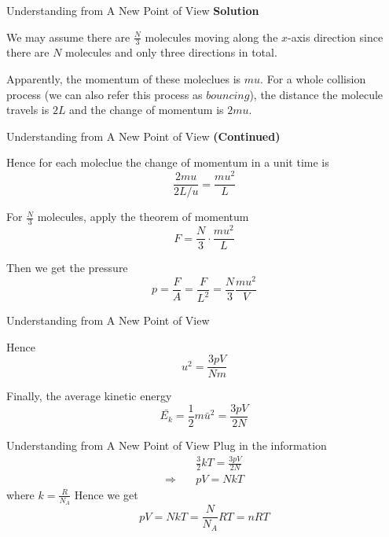 \documentclass[12pt,compress]{beamer}
\begin{document}
\begin{frame}{Understanding from A New Point of View}
	\textbf{Solution}
	\par We may assume there are $\frac{N}{3}$ molecules moving along the $x$-axis direction
	since there are $N$ molecules and only three directions in total.
	\par Apparently, the momentum of these moleclues is $mu$. For a whole collision process
	(we can also refer this process as $bouncing$), the distance the molecule travels is $2L$
	and the change of momentum is $2mu$.
\end{frame}
\begin{frame}{Understanding from A New Point of View}
	\textbf{(Continued)}
	\par Hence for each moleclue the change of momentum in a unit time is
	\begin{equation}
		\frac{2mu}{2L/u} = \frac{mu^2}{L}
		\label{eq:impulse}
	\end{equation}
	\par For $\frac{N}{3}$ molecules, apply the theorem of momentum
	\begin{equation}
		F = \frac{N}{3} \cdot \frac{mu^2}{L}
	\end{equation}
	\par Then we get the pressure
	\begin{equation}
		p = \frac{F}{A} = \frac{F}{L^2} = \frac{N}{3}\frac{mu^2}{V}
	\end{equation}
\end{frame}
\begin{frame}{Understanding from A New Point of View}
	\par Hence
	\begin{equation}
		u^2 = \frac{3pV}{Nm}
		\label{eq:u}
	\end{equation}
	\par Finally, the average kinetic energy
	\begin{equation}
		\bar{E_k} = \frac{1}{2}m\bar{u}^2 = \frac{3pV}{2N}
	\end{equation}
\end{frame}
\begin{frame}{Understanding from A New Point of View}
	Plug in the information
	\begin{align}
		                  & \frac{3}{2}kT = \frac{3pV}{2N} \\
		\Rightarrow \quad & pV = NkT
	\end{align}
	where $k = \frac{R}{N_A}$
	Hence we get
	\begin{equation}
		pV = NkT = \frac{N}{N_A}RT = nRT
	\end{equation}
\end{frame}
\end{document}

